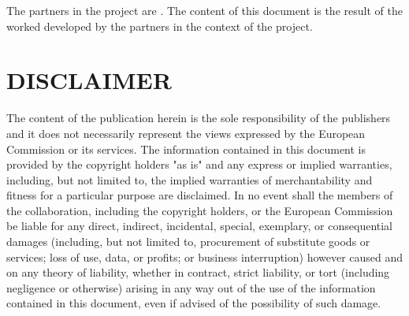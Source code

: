 The partners in the project are 
.
The content of this document is the result of the worked developed by the partners in the context of the project.

\section*{DISCLAIMER}

The content of the publication herein is the sole responsibility of the publishers and it does not necessarily represent the views expressed by the European Commission or its services.
The information contained in this document is provided by the copyright holders "as is" and any express or implied warranties, including, but not limited to, the implied warranties of merchantability and fitness for a particular purpose are disclaimed. 
In no event shall the members of the \ProjAcro collaboration, including the copyright holders, or the European Commission be liable for any direct, indirect, incidental, special, exemplary, or consequential damages (including, but not limited to, procurement of substitute goods or services; loss of use, data, or profits; or business interruption) however caused and on any theory of liability, whether in contract, strict liability, or tort (including negligence or otherwise) arising in any way out of the use of the information contained in this document, even if advised of the possibility of such damage.

\newpage
\tableofcontents

\newpage

